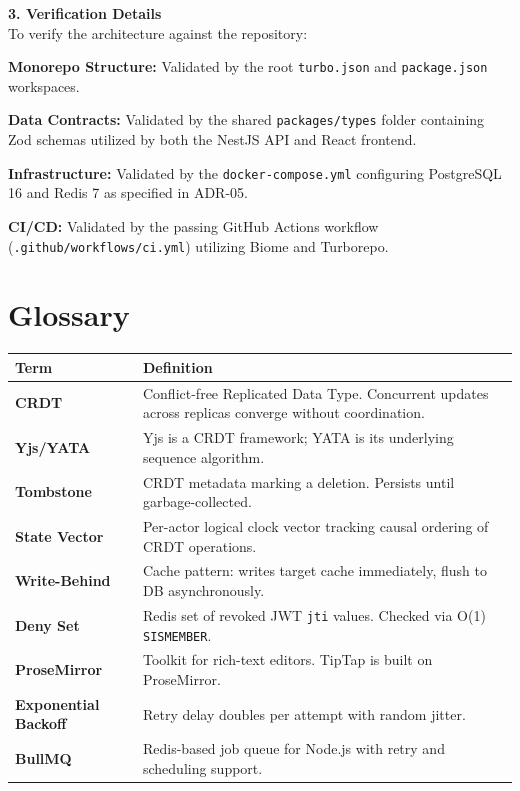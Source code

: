 \documentclass[10pt, a4paper]{article}
\begin{document}
\vspace{10pt}
\noindent
\textbf{\large 3. Verification Details}\\[4pt]
To verify the architecture against the repository:
\begin{speclist}
    \item \textbf{Monorepo Structure:} Validated by the root \texttt{turbo.json} and \texttt{package.json} workspaces.
    \item \textbf{Data Contracts:} Validated by the shared \texttt{packages/types} folder containing Zod schemas utilized by both the NestJS API and React frontend.
    \item \textbf{Infrastructure:} Validated by the \texttt{docker-compose.yml} configuring PostgreSQL 16 and Redis 7 as specified in ADR-05.
    \item \textbf{CI/CD:} Validated by the passing GitHub Actions workflow (\texttt{.github/workflows/ci.yml}) utilizing Biome and Turborepo.
\end{speclist}

\newpage
\section{Glossary}

{\small
\begin{tabularx}{\textwidth}{@{}>{\bfseries\sffamily}lX@{}}
\toprule
\textsf{Term} & \textsf{Definition} \\
\midrule
CRDT & Conflict-free Replicated Data Type. Concurrent updates across replicas converge without coordination. \\
Yjs/YATA & Yjs is a CRDT framework; YATA is its underlying sequence algorithm. \\
Tombstone & CRDT metadata marking a deletion. Persists until garbage-collected. \\
State Vector & Per-actor logical clock vector tracking causal ordering of CRDT operations. \\
Write-Behind & Cache pattern: writes target cache immediately, flush to DB asynchronously. \\
Deny Set & Redis set of revoked JWT \texttt{jti} values. Checked via O(1) \texttt{SISMEMBER}. \\
ProseMirror & Toolkit for rich-text editors. TipTap is built on ProseMirror. \\
Exponential Backoff & Retry delay doubles per attempt with random jitter. \\
BullMQ & Redis-based job queue for Node.js with retry and scheduling support. \\
\bottomrule
\end{tabularx}
}
\end{document}
